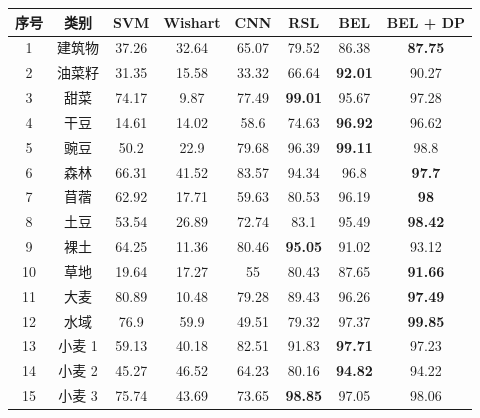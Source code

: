\begin{table}[ht!]
  \begin{tabular}{cccccccc}
    \toprule[1.5bp]
    序号                        & 类别    & SVM   & Wishart & CNN   & RSL            & BEL            & BEL + DP       \\
    \midrule[0.75bp]
    1                         & 建筑物   & 37.26 & 32.64   & 65.07 & 79.52          & 86.38          & \textbf{87.75} \\
    2                         & 油菜籽   & 31.35 & 15.58   & 33.32 & 66.64          & \textbf{92.01} & 90.27          \\
    3                         & 甜菜    & 74.17 & 9.87    & 77.49 & \textbf{99.01} & 95.67          & 97.28          \\
    4                         & 干豆    & 14.61 & 14.02   & 58.6  & 74.63          & \textbf{96.92} & 96.62          \\
    5                         & 豌豆    & 50.2  & 22.9    & 79.68 & 96.39          & \textbf{99.11} & 98.8           \\
    6                         & 森林    & 66.31 & 41.52   & 83.57 & 94.34          & 96.8           & \textbf{97.7}  \\
    7                         & 苜蓿    & 62.92 & 17.71   & 59.63 & 80.53          & 96.19          & \textbf{98}    \\
    8                         & 土豆    & 53.54 & 26.89   & 72.74 & 83.1           & 95.49          & \textbf{98.42} \\
    9                         & 裸土    & 64.25 & 11.36   & 80.46 & \textbf{95.05} & 91.02          & 93.12          \\
    10                        & 草地    & 19.64 & 17.27   & 55    & 80.43          & 87.65          & \textbf{91.66} \\
    11                        & 大麦    & 80.89 & 10.48   & 79.28 & 89.43          & 96.26          & \textbf{97.49} \\
    12                        & 水域    & 76.9  & 59.9    & 49.51 & 79.32          & 97.37          & \textbf{99.85} \\
    13                        & 小麦 1  & 59.13 & 40.18   & 82.51 & 91.83          & \textbf{97.71} & 97.23          \\
    14                        & 小麦 2  & 45.27 & 46.52   & 64.23 & 80.16          & \textbf{94.82} & 94.22          \\
    15                        & 小麦 3  & 75.74 & 43.69   & 73.65 & \textbf{98.85} & 97.05          & 98.06          \\

\end{tabular}
\end{table}
